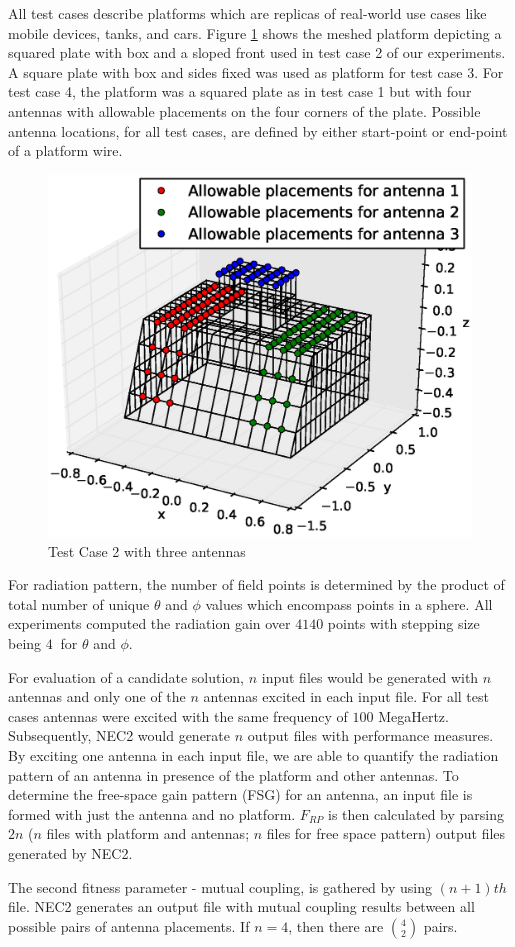 \documentclass[conference]{IEEEtran}
\begin{document}
All test cases describe platforms which are replicas of real-world use cases like mobile devices, tanks, and cars. Figure \ref{fig:plat2} shows the meshed platform depicting a squared plate with box and a sloped front used in test case 2 of our experiments. A square plate with box and sides fixed was used as platform for test case 3. For test case 4, the platform was a squared plate as in test case 1 but with four antennas with allowable placements on the four corners of the plate. Possible antenna locations, for all test cases, are defined by either start-point or end-point of a platform wire.
\begin{figure}
    \begin{center}
        \includegraphics[width=.41\textwidth]{FIG/tc_2_figure}
\end{center}
\caption{Test Case 2 with three antennas}
\label{fig:plat2}
\end{figure}

For radiation pattern, the number of field points is determined by the product of total number of unique $\theta$ and $\phi$ values which encompass points in a sphere. All experiments computed the radiation gain over $4140$ points with stepping size being $4$\textdegree $~$ for $\theta$ and $\phi$.

For evaluation of a candidate solution, $n$ input files would be generated with $n$ antennas and only one of the $n$ antennas excited in each input file. For all test cases antennas were excited with the same frequency of $100$ MegaHertz. Subsequently, NEC2 would generate $n$ output files with performance measures. By exciting one antenna in each input file, we are able to quantify the radiation pattern of an antenna in presence of the platform and other antennas. To determine the free-space gain pattern (FSG) for an antenna, an input file is formed with just the antenna and no platform. $F_{RP}$ is then calculated by parsing $2n$ ($n$ files with platform and antennas; $n$ files for free space pattern) output files generated by NEC2.

The second fitness parameter - mutual coupling, is gathered by using $(n+1)th$ file. NEC2 generates an output file with mutual coupling results between all possible pairs of antenna placements. If $n=4$, then there are $\binom{4}{2}$ pairs. 
\end{document}
